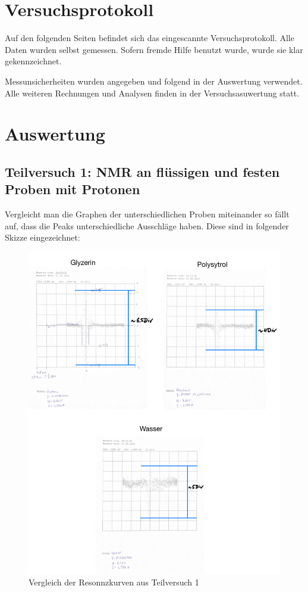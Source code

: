 \documentclass{article}
\begin{document}
\newpage

\section{Versuchsprotokoll}

Auf den folgenden Seiten befindet sich das eingescannte Versuchsprotokoll.
Alle Daten wurden selbst gemessen. Sofern fremde Hilfe benutzt wurde,
wurde sie klar gekennzeichnet.

Messunsicherheiten wurden angegeben und folgend in der Auswertung verwendet.
Alle weiteren Rechnungen und Analysen finden in der Versuchsasuwertung statt.



\newpage

\section{Auswertung}

\subsection{Teilversuch 1: NMR an flüssigen und festen Proben mit Protonen}

Vergleicht man die Graphen der unterschiedlichen Proben miteinander so fällt auf, dass die Peaks unterschiedliche Ausschläge haben. Diese sind in folgender Skizze eingezeichnet:

    \begin{figure}[H]
        \centering
        \includegraphics[width=0.7\linewidth]{Abbildungen/VergleichGraphenTV1.jpeg}
        \caption{Vergleich der Resonnzkurven aus Teilversuch 1}
    \end{figure}
\end{document}
